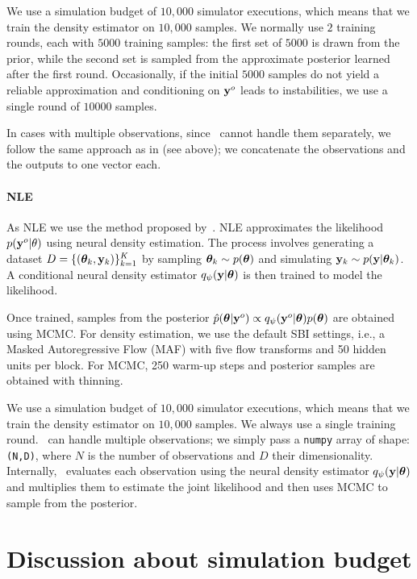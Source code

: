 We use a simulation budget of $10,000$ simulator executions, which means that we train the density estimator on $10,000$ samples.
We normally use $2$ training rounds, each with $5000$ training samples: the first set of $5000$ is drawn from the prior, while the second set is sampled from the approximate posterior learned after the first round. Occasionally, if the initial $5000$ samples do not yield a reliable approximation and conditioning on $\mathbf{y}^o$ leads to instabilities, we use a single round of $10000$ samples.

In cases with multiple observations, since \NPE~cannot handle them separately, we follow the same approach as in \nromc (see above); we concatenate the observations and the outputs to one vector each.

\paragraph{NLE}

As NLE we use the method proposed by~\cite{papamakarios2019sequential}.
NLE approximates the likelihood \( p(\mathbf{y}^o|\theta) \) using neural density estimation. The process involves generating a dataset \( D = \{(\boldsymbol{\theta}_k, \mathbf{y}_k)\}_{k=1}^K \) by sampling \( \boldsymbol{\theta}_k \sim p(\boldsymbol{\theta}) \) and simulating \( \mathbf{y}_k \sim p(\mathbf{y}|\boldsymbol{\theta}_k) \). A conditional neural density estimator \( q_\psi(\mathbf{y}|\boldsymbol{\theta}) \) is then trained to model the likelihood.

Once trained, samples from the posterior \( \hat{p}(\boldsymbol{\theta}|\mathbf{y}^o) \propto q_\psi(\mathbf{y}^o|\boldsymbol{\theta}) p(\boldsymbol{\theta}) \) are obtained using MCMC.
For density estimation, we use the default SBI settings, i.e., a Masked Autoregressive Flow (MAF) with five flow transforms and 50 hidden units per block. For MCMC, 250 warm-up steps and posterior samples are obtained with thinning.

We use a simulation budget of $10,000$ simulator executions, which means that we train the density estimator on $10,000$ samples. We always use a single training round.
\NLE~can handle multiple observations; we simply pass a \texttt{numpy} array of shape: \texttt{(N,D)}, where $N$ is the number of observations and $D$ their dimensionality. Internally, \NLE~evaluates each observation using the neural density estimator $ q_\psi(\mathbf{y}|\boldsymbol{\theta}) $ and multiplies them to estimate the joint likelihood and then uses MCMC to sample from the posterior.

\clearpage

\section{Discussion about simulation budget}
\label{app-sec:compute-budget}

